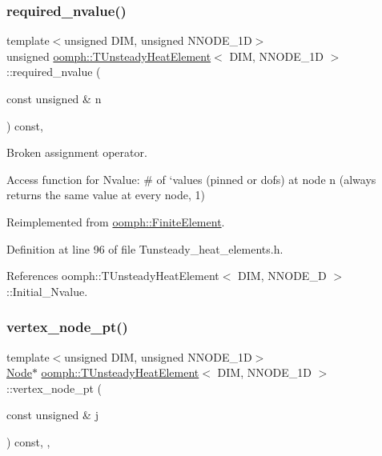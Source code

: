 \subsubsection{\texorpdfstring{required\+\_\+nvalue()}{required\_nvalue()}}
{\footnotesize\ttfamily template$<$unsigned D\+IM, unsigned N\+N\+O\+D\+E\+\_\+1D$>$ \\
unsigned \hyperlink{classoomph_1_1TUnsteadyHeatElement}{oomph\+::\+T\+Unsteady\+Heat\+Element}$<$ D\+IM, N\+N\+O\+D\+E\+\_\+1D $>$\+::required\+\_\+nvalue (\begin{DoxyParamCaption}\item[{const unsigned \&}]{n }\end{DoxyParamCaption}) const\hspace{0.3cm}{\ttfamily [inline]}, {\ttfamily [virtual]}}



Broken assignment operator. 

Access function for Nvalue\+: \# of `values\textquotesingle{} (pinned or dofs) at node n (always returns the same value at every node, 1) 

Reimplemented from \hyperlink{classoomph_1_1FiniteElement_a56610c60d5bc2d7c27407a1455471b1a}{oomph\+::\+Finite\+Element}.



Definition at line 96 of file Tunsteady\+\_\+heat\+\_\+elements.\+h.



References oomph\+::\+T\+Unsteady\+Heat\+Element$<$ D\+I\+M, N\+N\+O\+D\+E\+\_\+D $>$\+::\+Initial\+\_\+\+Nvalue.

\mbox{\label{classoomph_1_1TUnsteadyHeatElement_aedf73b18995cae17e438ac72bb7ef959}} 
\subsubsection{\texorpdfstring{vertex\+\_\+node\+\_\+pt()}{vertex\_node\_pt()}}
{\footnotesize\ttfamily template$<$unsigned D\+IM, unsigned N\+N\+O\+D\+E\+\_\+1D$>$ \\
\hyperlink{classoomph_1_1Node}{Node}$\ast$ \hyperlink{classoomph_1_1TUnsteadyHeatElement}{oomph\+::\+T\+Unsteady\+Heat\+Element}$<$ D\+IM, N\+N\+O\+D\+E\+\_\+1D $>$\+::vertex\+\_\+node\+\_\+pt (\begin{DoxyParamCaption}\item[{const unsigned \&}]{j }\end{DoxyParamCaption}) const\hspace{0.3cm}{\ttfamily [inline]}, {\ttfamily [protected]}, {\ttfamily [virtual]}}



